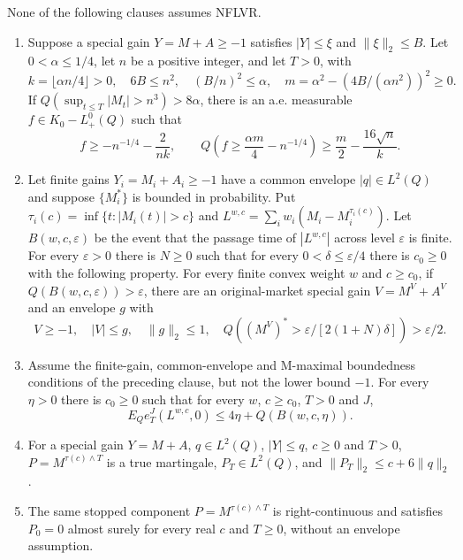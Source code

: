 \begin{proposition}\label{input:finite}
None of the following clauses assumes NFLVR.
\leavevmode\par
\begin{enumerate}
\item {}
Suppose a special gain $Y=M+A\geq-1$ satisfies $|Y|\leq\xi$ and $\|\xi\|_2\leq B$.
Let $0<\alpha\leq1/4$, let $n$ be a positive integer, and let $T>0$, with
\[
 k=\lfloor\alpha n/4\rfloor>0,\quad 6B\leq n^2,\quad (B/n)^2\leq\alpha,
 \quad m=\alpha^2-(4B/(\alpha n^2))^2\geq0.
\]
If $Q(\sup_{t\leq T}|M_t|>n^3)>8\alpha$, there is an a.e. measurable $f\in K_0-L^0_+(Q)$ such that
\[
 f\geq-n^{-1/4}-\frac2{nk},\qquad
 Q\left(f\geq\frac{\alpha m}4-n^{-1/4}\right)
 \geq\frac m2-\frac{16\sqrt n}{k}.
\]
\item {}
Let finite gains $Y_i=M_i+A_i\geq-1$ have a common envelope $|q|\in L^2(Q)$ and suppose $\{M_i^*\}$ is bounded in probability.
Put $\tau_i(c)=\inf\{t:|M_i(t)|>c\}$ and $L^{w,c}=\sum_iw_i(M_i-M_i^{\tau_i(c)})$.
Let $B(w,c,\varepsilon)$ be the event that the passage time of $|L^{w,c}|$ across level $\varepsilon$ is finite.
For every $\varepsilon>0$ there is $N\geq0$ such that for every $0<\delta\leq\varepsilon/4$ there is $c_0\geq0$ with the following property.
For every finite convex weight $w$ and $c\geq c_0$, if $Q(B(w,c,\varepsilon))>\varepsilon$,
there are an original-market special gain $V=M^V+A^V$ and an envelope $g$ with
\[
 V\geq-1,\quad |V|\leq g,\quad \|g\|_2\leq1,\quad
 Q((M^V)^*>\varepsilon/[2(1+N)\delta])>\varepsilon/2.
\]
\item {}
Assume the finite-gain, common-envelope and M-maximal boundedness conditions of the preceding clause, but not the lower bound $-1$.
For every $\eta>0$ there is $c_0\geq0$ such that for every $w$, $c\geq c_0$, $T>0$ and $J$,
\[
 E_Q e_T^J(L^{w,c},0)\leq4\eta+Q(B(w,c,\eta)).
\]
\item {}
For a special gain $Y=M+A$, $q\in L^2(Q)$, $|Y|\leq q$, $c\geq0$ and $T>0$,
$P=M^{\tau(c)\wedge T}$ is a true martingale, $P_T\in L^2(Q)$, and
$\|P_T\|_2\leq c+6\|q\|_2$.
\item {}
The same stopped component $P=M^{\tau(c)\wedge T}$ is right-continuous and satisfies $P_0=0$ almost surely
for every real $c$ and $T\geq0$, without an envelope assumption.
\end{enumerate}
\end{proposition}

